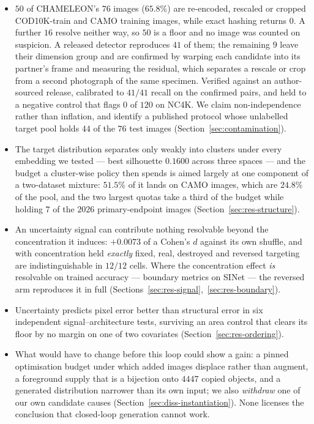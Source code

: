\documentclass{article} %
\begin{document}
\begin{itemize}
\itemsep0.02em
\item $50$ of CHAMELEON's $76$ images ($65.8\%$) are re-encoded, rescaled or cropped
COD10K-train and CAMO training images, while exact hashing returns $0$. A further $16$ resolve
neither way, so $50$ is a floor and no image was counted on suspicion. A released detector
reproduces $41$ of them; the remaining $9$ leave their dimension group and are confirmed by warping
each candidate into its partner's frame and measuring the residual, which separates a rescale or
crop from a second photograph of the same specimen. Verified against an author-sourced release,
calibrated to $41/41$ recall on the confirmed pairs, and held to a negative control that flags
$0$ of $120$ on NC4K. We claim non-independence rather than inflation, and identify a published protocol whose
unlabelled target pool holds $44$ of the $76$ test images (Section~\ref{sec:contamination}).
\item The target distribution separates only weakly into clusters under every embedding we tested
--- best silhouette $0.1600$ across three spaces --- and the budget a cluster-wise policy then
spends is aimed largely at one component of a two-dataset mixture: $51.5\%$ of it lands on CAMO
images, which are $24.8\%$ of the pool, and the two largest quotas take a third of the budget while
holding $7$ of the $2026$ primary-endpoint images (Section~\ref{sec:res-structure}).
\item An uncertainty signal can contribute nothing resolvable beyond the concentration it induces:
$+0.0073$ of a Cohen's $d$ against its own shuffle, and with concentration held \emph{exactly}
fixed, real, destroyed and reversed targeting are indistinguishable in $12/12$ cells. Where the
concentration effect \emph{is} resolvable on trained accuracy --- boundary metrics on SINet --- the
reversed arm reproduces it in full (Sections~\ref{sec:res-signal},~\ref{sec:res-boundary}).
\item Uncertainty predicts pixel error better than structural error in six independent
signal--architecture tests, surviving an area control that clears its floor by no margin on one of
two covariates (Section~\ref{sec:res-ordering}).
\item What would have to change before this loop could show a gain: a pinned optimisation budget
under which added images displace rather than augment, a foreground supply that is a bijection onto
$4447$ copied objects, and a generated distribution narrower than its own input; we also
\emph{withdraw} one of our own candidate causes (Section~\ref{sec:diss-instantiation}). None
licenses the conclusion that closed-loop generation cannot work.
\end{itemize}
\end{document}
